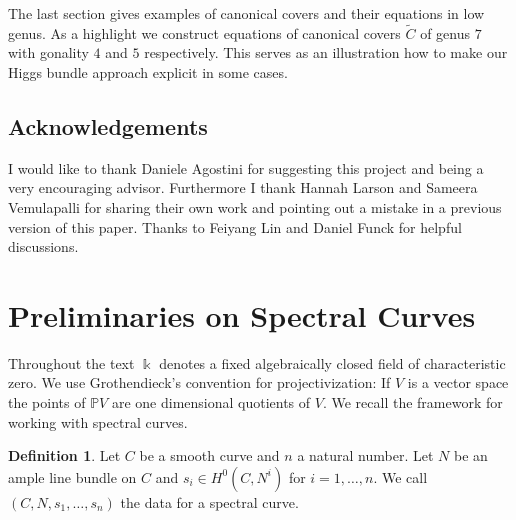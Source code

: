 \documentclass[12pt]{extarticle}
\theoremstyle{definition}
\newtheorem{definition}[theorem]{Definition}
\numberwithin{theorem}{section}
\newcommand{\PP}{\mathbb{P}}
\renewcommand{\tilde}{\widetilde}		%
\begin{document}
The last section gives examples of canonical covers and their equations in low genus. As a highlight we construct equations of canonical covers $\tilde{C}$ of genus $7$ with gonality $4$ and $5$ respectively. This serves as an illustration how to make our Higgs bundle approach explicit in some cases.    
\subsection*{Acknowledgements} 
I would like to thank Daniele Agostini for suggesting this project and being a very encouraging advisor. Furthermore I thank Hannah Larson and Sameera Vemulapalli for sharing their own work and pointing out a mistake in a previous version of this paper. Thanks to Feiyang Lin and Daniel Funck for helpful discussions.
\section{Preliminaries on Spectral Curves}\label{section:prelim}

Throughout the text $\Bbbk$ denotes a fixed algebraically closed field of characteristic zero. We use Grothendieck's convention for projectivization: If $V$ is a vector space the points of $\PP V$ are one dimensional quotients of $V$. We recall the framework for working with spectral curves. 

\begin{definition}
Let $C$ be a smooth curve and $n$ a natural number. Let $N$ be an ample line bundle on $C$ and $s_i \in H^0(C,N^i)$ for $i=1,\ldots,n$. We call $(C,N,s_1,\ldots,s_n)$ the data for a spectral curve. 
\end{definition}
\end{document}
